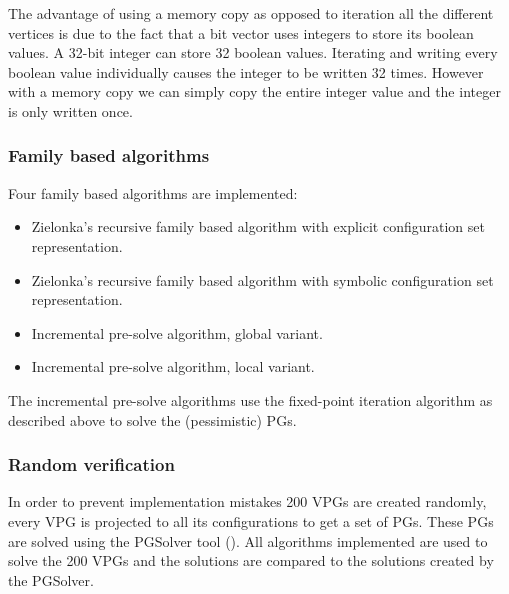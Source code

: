 The advantage of using a memory copy as opposed to iteration all the different vertices is due to the fact that a bit vector uses integers to store its boolean values. A 32-bit integer can store 32 boolean values. Iterating and writing every boolean value individually causes the integer to be written 32 times. However with a memory copy we can simply copy the entire integer value and the integer is only written once.
\subsubsection{Family based algorithms}
Four family based algorithms are implemented:
\begin{itemize}
	\item Zielonka's recursive family based algorithm with explicit configuration set representation.
	\item Zielonka's recursive family based algorithm with symbolic configuration set representation.
	\item Incremental pre-solve algorithm, global variant.
	\item Incremental pre-solve algorithm, local variant.
\end{itemize}
The incremental pre-solve algorithms use the fixed-point iteration algorithm as described above to solve the (pessimistic) PGs.
\subsubsection{Random verification}
In order to prevent implementation mistakes 200 VPGs are created randomly, every VPG is projected to all its configurations to get a set of PGs. These PGs are solved using the PGSolver tool (\cite{Friedmann2010ThePC}). All algorithms implemented are used to solve the 200 VPGs and the solutions are compared to the solutions created by the PGSolver.